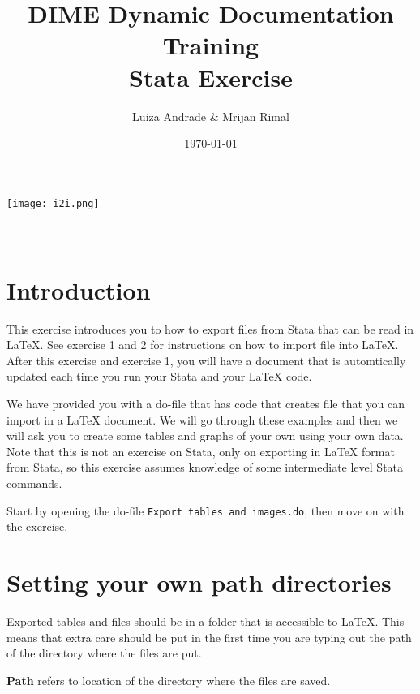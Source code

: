 \documentclass[]{article}
\title{DIME Dynamic Documentation Training \\ Stata Exercise}
\author{Luiza Andrade \& Mrijan Rimal}
\date{\today}
\begin{document}
\makeatletter
\begin{titlepage}
	\begin{center}
		\texttt{[image: i2i.png]}\\[10ex]
		{\LARGE \bfseries  \@title }\\[2ex] 
		{\Large  \@author}\\[20ex] 
		{\large \@date}
	\end{center}
\end{titlepage}
\makeatother

\section*{Introduction}
This exercise introduces you to how to export files from Stata that can be read in {\LaTeX}. See exercise 1 and 2 for instructions on how to import file into {\LaTeX}. After this exercise and exercise 1, you will have a document that is automtically updated each time you run your Stata and your {\LaTeX} code.

We have provided you with a do-file that has code that creates file that you can import in a {\LaTeX} document. We will go through these examples and then we will ask you to create some tables and graphs of your own using your own data. Note that this is not an exercise on Stata, only on exporting in {\LaTeX} format from Stata, so this exercise assumes knowledge of some intermediate level Stata commands.

Start by opening the do-file \texttt{Export tables and images.do}, then move on with the exercise.


\section*{Setting your own path directories}


Exported tables and files should be in a folder that is accessible to {\LaTeX}. This means that extra care should be put in the first time you are typing out the path of the directory where the files are put. 


\textbf{Path} refers to location of the directory where the files are saved. \\
\end{document}
